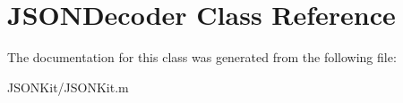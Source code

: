 \hypertarget{class_j_s_o_n_decoder}{\section{J\+S\+O\+N\+Decoder Class Reference}
\label{class_j_s_o_n_decoder}
}


The documentation for this class was generated from the following file\+:\begin{DoxyCompactItemize}
\item 
J\+S\+O\+N\+Kit/J\+S\+O\+N\+Kit.\+m\end{DoxyCompactItemize}
